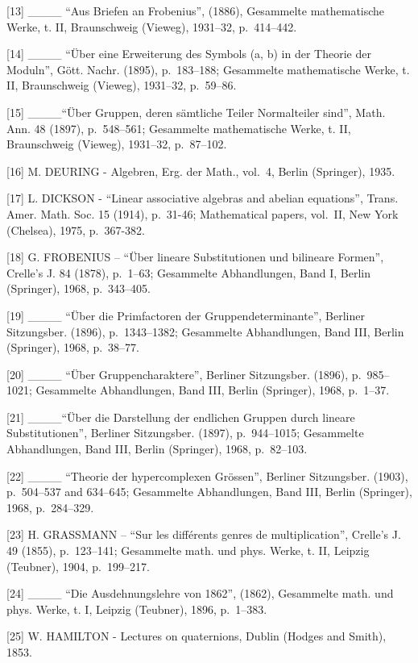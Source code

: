 {[}13{]} \_\_\_\_ ``Aus Briefen an Frobenius'', (1886), Gesammelte mathematische Werke, t. II, Braunschweig (Vieweg), 1931--32, p.~414--442.

{[}14{]} \_\_\_\_ ``Über eine Erweiterung des Symbols (a, b) in der Theorie der Moduln'', Gött. Nachr. (1895), p.~183--188; Gesammelte mathematische Werke, t. II, Braunschweig (Vieweg), 1931--32, p.~59--86.

{[}15{]} \_\_\_\_``Über Gruppen, deren sämtliche Teiler Normalteiler sind'', Math. Ann. 48 (1897), p.~548--561; Gesammelte mathematische Werke, t. II, Braunschweig (Vieweg), 1931--32, p.~87--102.

{[}16{]} M. DEURING - Algebren, Erg. der Math., vol.~4, Berlin (Springer), 1935.

{[}17{]} L. DICKSON - ``Linear associative algebras and abelian equations'', Trans. Amer. Math. Soc. 15 (1914), p.~31-46; Mathematical papers, vol.~II, New York (Chelsea), 1975, p.~367-382.

{[}18{]} G. FROBENIUS -- ``Über lineare Substitutionen und bilineare Formen'', Crelle's J. 84 (1878), p.~1--63; Gesammelte Abhandlungen, Band I, Berlin (Springer), 1968, p.~343--405.

{[}19{]} \_\_\_\_ ``Über die Primfactoren der Gruppendeterminante'', Berliner Sitzungsber. (1896), p.~1343--1382; Gesammelte Abhandlungen, Band III, Berlin (Springer), 1968, p.~38--77.

{[}20{]} \_\_\_\_ ``Über Gruppencharaktere'', Berliner Sitzungsber. (1896), p.~985--1021; Gesammelte Abhandlungen, Band III, Berlin (Springer), 1968, p.~1--37.

{[}21{]} \_\_\_\_``Über die Darstellung der endlichen Gruppen durch lineare Substitutionen'', Berliner Sitzungsber. (1897), p.~944--1015; Gesammelte Abhandlungen, Band III, Berlin (Springer), 1968, p.~82--103.

{[}22{]} \_\_\_\_ ``Theorie der hypercomplexen Grössen'', Berliner Sitzungsber. (1903), p.~504--537 and 634--645; Gesammelte Abhandlungen, Band III, Berlin (Springer), 1968, p.~284--329.

{[}23{]} H. GRASSMANN -- ``Sur les différents genres de multiplication'', Crelle's J. 49 (1855), p.~123--141; Gesammelte math. und phys. Werke, t. II, Leipzig (Teubner), 1904, p.~199--217.

{[}24{]} \_\_\_\_ ``Die Ausdehnungslehre von 1862'', (1862), Gesammelte math. und phys. Werke, t. I, Leipzig (Teubner), 1896, p.~1--383.

{[}25{]} W. HAMILTON - Lectures on quaternions, Dublin (Hodges and Smith), 1853.

